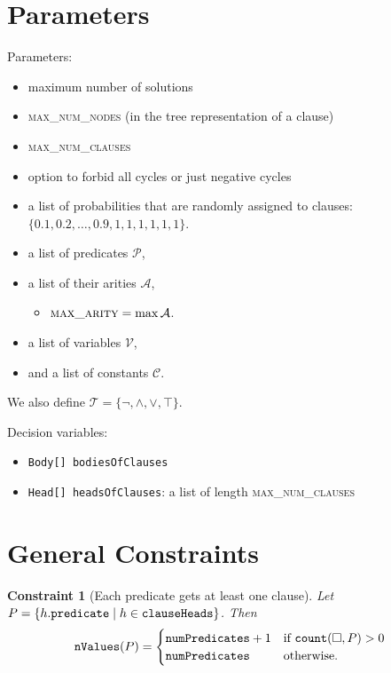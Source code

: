 \documentclass{article}
\newtheorem{constraint}{Constraint}
\theoremstyle{definition}
\newcommand{\variable}[1]{\texttt{\textup{#1}}}
\newcommand{\predicates}{\mathcal{P}}
\newcommand{\variables}{\mathcal{V}}
\newcommand{\constants}{\mathcal{C}}
\newcommand{\tokens}{\mathcal{T}}
\newcommand{\arities}{\mathcal{A}}
\newcommand{\maxArity}{\textsc{max\_arity}}
\newcommand{\maxNumNodes}{\textsc{max\_num\_nodes}}
\newcommand{\maxNumClauses}{\textsc{max\_num\_clauses}}
\begin{document}
\section{Parameters}

Parameters:
\begin{itemize}
\item maximum number of solutions
\item \maxNumNodes{} (in the tree representation of a clause)
\item \maxNumClauses{}
\item option to forbid all cycles or just negative cycles
\item a list of probabilities that are randomly assigned to clauses: $\{ 0.1,
  0.2, \dots, 0.9, 1, 1, 1, 1, 1, 1 \}$.
\item a list of predicates $\predicates{}$,
\item a list of their arities $\arities{}$,
  \begin{itemize}
  \item $\maxArity{} = \max \arities{}$.
  \end{itemize}
\item a list of variables $\variables{}$,
\item and a list of constants $\constants{}$.
\end{itemize}

We also define $\tokens{} = \{ \neg, \land, \lor, \top \}$.

Decision variables:
\begin{itemize}
\item \variable{Body[] bodiesOfClauses}
\item \variable{Head[] headsOfClauses}: a list of length \maxNumClauses{}
\end{itemize}

\section{General Constraints}

\begin{constraint}[Each predicate gets at least one clause]
  Let $P = \{ h.\variable{predicate} \mid h \in \variable{clauseHeads} \}$. Then
  \[
    \variable{nValues}(P) =
    \begin{cases}
      \variable{numPredicates} + 1 & \text{if } \variable{count}(\Box, P) > 0 \\
      \variable{numPredicates} & \text{otherwise.}
    \end{cases}
  \]
\end{constraint}
\end{document}
